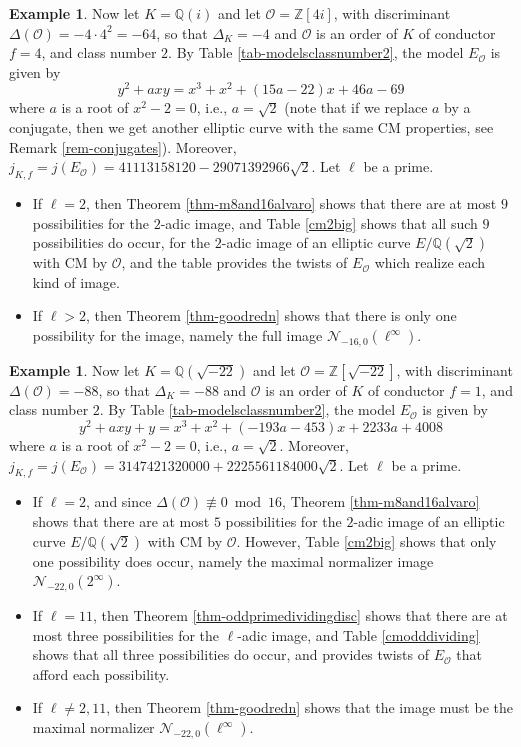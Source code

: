 \documentclass[11pt]{amsart}
\theoremstyle{definition}
\newtheorem{example}[defn]{Example}
\newcommand{\Q}{\mathbb Q}
\newcommand{\Z}{\mathbb Z}
\begin{document}
\begin{example}
    Now let $K=\Q(i)$ and let $\mathcal{O}=\Z[4i]$, with discriminant $\Delta(\mathcal{O})=-4\cdot 4^2=-64$, so that $\Delta_K=-4$ and $\mathcal{O}$ is an order of $K$ of conductor $f=4$, and class number $2$. By Table \ref{tab-modelsclassnumber2}, the model $E_\mathcal{O}$ is given by
    $$y^2 + axy = x^3 + x^2 + (15a - 22)x + 46a - 69$$
    where $a$ is a root of $x^2-2=0$, i.e., $a=\sqrt{2}$ (note that if we replace $a$ by a conjugate, then we get another elliptic curve with the same CM properties, see Remark \ref{rem-conjugates}). Moreover, $j_{K,f}=j(E_\mathcal{O})= 41113158120-29071392966 \sqrt{2}$. Let $\ell$ be a prime.
    \begin{itemize}
        \item If $\ell=2$, then Theorem \ref{thm-m8and16alvaro} shows that there are at most $9$ possibilities for the $2$-adic image, and  Table \ref{cm2big} shows that all such $9$ possibilities do occur, for the $2$-adic image of an elliptic curve $E/\Q(\sqrt{2})$ with CM by $\mathcal{O}$, and the table provides the twists of $E_\mathcal{O}$ which realize each kind of image.
        \item If $\ell>2$, then Theorem \ref{thm-goodredn} shows that there is only one possibility for the image, namely the full image $\mathcal{N}_{-16,0}(\ell^\infty)$.
    \end{itemize}
\end{example}

\begin{example}
    Now let $K=\Q(\sqrt{-22})$ and let $\mathcal{O}=\Z[\sqrt{-22}]$, with discriminant $\Delta(\mathcal{O})=-88$, so that $\Delta_K=-88$ and $\mathcal{O}$ is an order of $K$ of conductor $f=1$, and class number $2$. By Table \ref{tab-modelsclassnumber2}, the model $E_\mathcal{O}$ is given by
    $$y^2 + axy + y = x^3 + x^2 + (-193a - 453)x + 2233a + 4008$$
    where $a$ is a root of $x^2-2=0$, i.e., $a=\sqrt{2}$. Moreover, $j_{K,f}=j(E_\mathcal{O})=  3147421320000+2225561184000\sqrt{2}$. Let $\ell$ be a prime.
    \begin{itemize}
        \item If $\ell=2$, and since $\Delta(\mathcal{O})\not\equiv 0 \bmod 16$, Theorem \ref{thm-m8and16alvaro} shows that there are at most $5$ possibilities for the $2$-adic image of an elliptic curve $E/\Q(\sqrt{2})$ with CM by $\mathcal{O}$. However, Table \ref{cm2big} shows that only one possibility does occur, namely the maximal normalizer image $\mathcal{N}_{-22,0}(2^\infty)$.
        \item If $\ell=11$, then Theorem \ref{thm-oddprimedividingdisc} shows that there are at most three possibilities for the $\ell$-adic image, and Table \ref{cmodddividing} shows that all three possibilities do occur, and provides twists of $E_\mathcal{O}$ that afford each possibility.  
        \item If $\ell\ne 2,11$, then Theorem \ref{thm-goodredn} shows that the image must be the maximal normalizer $\mathcal{N}_{-22,0}(\ell^\infty).$
    \end{itemize}
\end{example}
\end{document}
